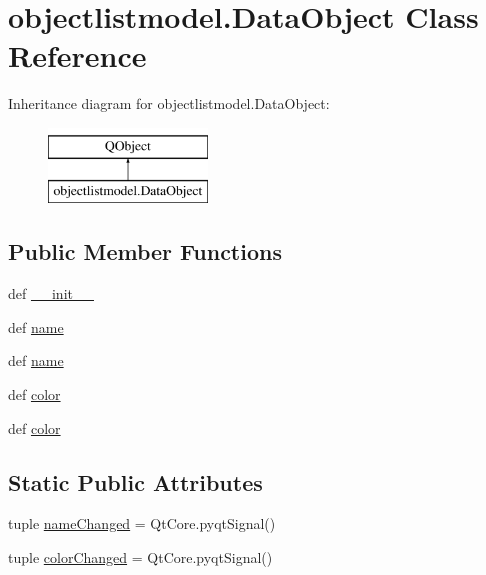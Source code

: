 \hypertarget{classobjectlistmodel_1_1DataObject}{}\section{objectlistmodel.\+Data\+Object Class Reference}
\label{classobjectlistmodel_1_1DataObject}
Inheritance diagram for objectlistmodel.\+Data\+Object\+:\begin{figure}[H]
\begin{center}
\leavevmode
\includegraphics[height=2.000000cm]{classobjectlistmodel_1_1DataObject}
\end{center}
\end{figure}
\subsection*{Public Member Functions}
\begin{DoxyCompactItemize}
\item 
def \hyperlink{classobjectlistmodel_1_1DataObject_a79c89223a672c06019329075d42d4f94}{\+\_\+\+\_\+init\+\_\+\+\_\+}
\item 
def \hyperlink{classobjectlistmodel_1_1DataObject_a31e6327ad2622e085222f3731e1ed6fd}{name}
\item 
def \hyperlink{classobjectlistmodel_1_1DataObject_a31e6327ad2622e085222f3731e1ed6fd}{name}
\item 
def \hyperlink{classobjectlistmodel_1_1DataObject_aa39683f4a5be62155366484466b21917}{color}
\item 
def \hyperlink{classobjectlistmodel_1_1DataObject_aa39683f4a5be62155366484466b21917}{color}
\end{DoxyCompactItemize}
\subsection*{Static Public Attributes}
\begin{DoxyCompactItemize}
\item 
tuple \hyperlink{classobjectlistmodel_1_1DataObject_a17de6b991c8e8221ea05d35e9b0dd676}{name\+Changed} = Qt\+Core.\+pyqt\+Signal()
\item 
tuple \hyperlink{classobjectlistmodel_1_1DataObject_a25c188859159ba5c234a177e3d4cd840}{color\+Changed} = Qt\+Core.\+pyqt\+Signal()
\end{DoxyCompactItemize}


